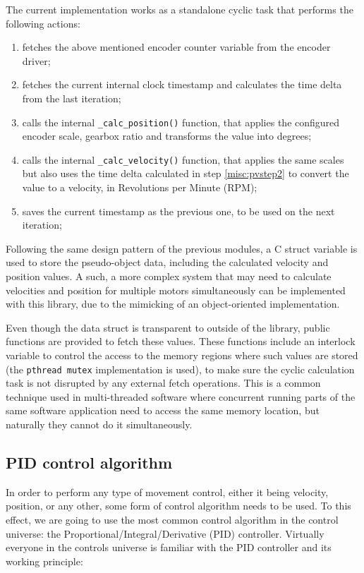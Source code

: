 The current implementation works as a standalone cyclic task that performs the following actions:
\begin{enumerate}
	\item fetches the above mentioned encoder counter variable from the encoder driver;
	\item fetches the current internal clock timestamp and calculates the time delta from the last iteration; \label{misc:pvstep2}
	\item calls the internal \verb|_calc_position()| function, that applies the configured encoder scale, gearbox ratio and transforms the value into degrees;
	\item calls the internal \verb|_calc_velocity()| function, that applies the same scales but also uses the time delta calculated in step \ref{misc:pvstep2} to convert the value to a velocity, in Revolutions per Minute (RPM);
	\item saves the current timestamp as the previous one, to be used on the next iteration;
\end{enumerate}

Following the same design pattern of the previous modules, a C struct variable is used to store the pseudo-object data, including the calculated velocity and position values.
A such, a more complex system that may need to calculate velocities and position for multiple motors simultaneously can be implemented with this library, due to the mimicking of an object-oriented implementation.

Even though the data struct is transparent to outside of the library, public functions are provided to fetch these values.
These functions include an interlock variable to control the access to the memory regions where such values are stored (the \verb|pthread mutex| implementation is used), to make sure the cyclic calculation task is not disrupted by any external fetch operations.
This is a common technique used in multi-threaded software where concurrent running parts of the same software application need to access the same memory location, but naturally they cannot do it simultaneously.

\subsection{PID control algorithm}
In order to perform any type of movement control, either it being velocity, position, or any other, some form of control algorithm needs to be used.
To this effect, we are going to use the most common control algorithm in the control universe: the Proportional/Integral/Derivative (PID) controller.
Virtually everyone in the controls universe is familiar with the PID controller and its working principle:

